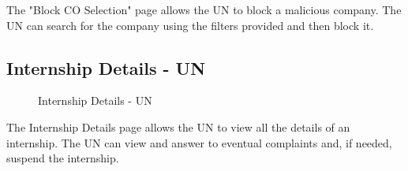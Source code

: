 \par The "Block CO Selection" page allows the UN to block a malicious company. The UN can search for the company using
the filters provided and then block it.

\subsection{Internship Details - UN}
\label{subsec:internship-details-un}%

\begin{figure}[H]
    \centering
    \caption{Internship Details - UN}
    \label{fig:internship-details-un}
\end{figure}

\par The Internship Details page allows the UN to view all the details of an internship. The UN can view and answer to
eventual complaints and, if needed, suspend the internship.
